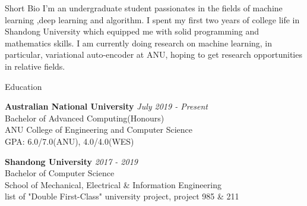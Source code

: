 \documentclass{resume} %
\begin{document}
\begin{rSection}{Short Bio}
	I’m an undergraduate student passionates in the fields of machine learning ,deep learning and algorithm. I spent my first two years of college life in Shandong University which equipped me with solid programming and mathematics skills. I am currently doing research on machine learning, in particular, variational auto-encoder at ANU, hoping to get research opportunities in relative fields.
\end{rSection}

\begin{rSection}{Education}

{\bf Australian National University} \hfill {\em July 2019 - Present} 
\\ Bachelor of Advanced Computing(Honours)
\\ ANU College of Engineering and Computer Science\\
 { GPA: 6.0/7.0(ANU), 4.0/4.0(WES) }
 
 {\bf Shandong University} \hfill {\em 2017 - 2019} 
\\ Bachelor of Computer Science
\\ School of Mechanical, Electrical \& Information Engineering
\\ list of "Double First-Class" university project, project 985 \& 211


\end{rSection}
\end{document}
